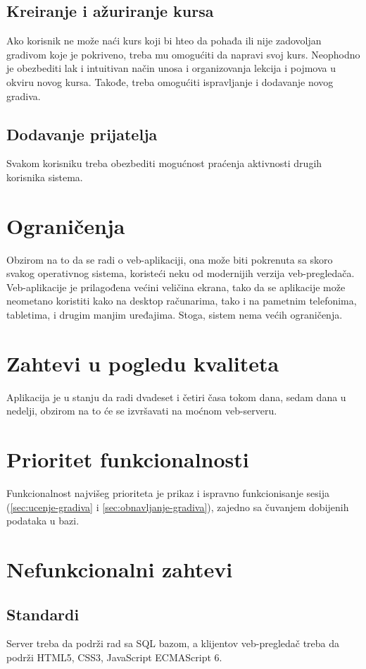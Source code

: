 \section{Kreiranje i ažuriranje kursa}
Ako korisnik ne može naći kurs koji bi hteo da pohađa ili nije zadovoljan gradivom koje je pokriveno, treba mu omogućiti da napravi svoj kurs. Neophodno je obezbediti lak i intuitivan način unosa i organizovanja lekcija i pojmova u okviru novog kursa. Takođe, treba omogućiti ispravljanje i dodavanje novog gradiva.

\section{Dodavanje prijatelja}
Svakom korisniku treba obezbediti mogućnost praćenja aktivnosti drugih korisnika sistema.

\chapter{Ograničenja}
Obzirom na to da se radi o veb-aplikaciji, ona može biti pokrenuta sa skoro svakog operativnog sistema, koristeći neku od modernijih verzija veb-pregledača.
Veb-aplikacije je prilagođena većini veličina ekrana, tako da se aplikacije može neometano koristiti kako na desktop računarima, tako i na pametnim telefonima, tabletima, i drugim manjim uređajima.
Stoga, sistem nema većih ograničenja.

\chapter{Zahtevi u pogledu kvaliteta}
Aplikacija je u stanju da radi dvadeset i četiri časa tokom dana, sedam dana u nedelji, obzirom na to će se izvršavati na moćnom veb-serveru.

\chapter{Prioritet funkcionalnosti}
Funkcionalnost najvišeg prioriteta je prikaz i ispravno funkcionisanje sesija (\ref{sec:ucenje-gradiva} i \ref{sec:obnavljanje-gradiva}), zajedno sa čuvanjem dobijenih podataka u bazi.

\chapter{Nefunkcionalni zahtevi}

\section{Standardi}
Server treba da podrži rad sa SQL bazom, a klijentov veb-pregledač treba da podrži HTML5, CSS3, JavaScript ECMAScript 6.

